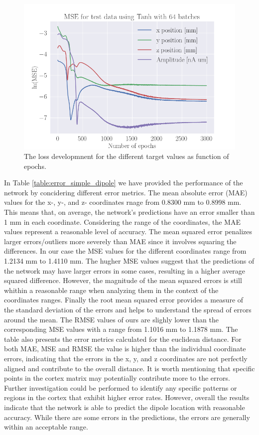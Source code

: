\documentclass[a4paper, UKenglish, 11pt]{uiomaster}
\begin{document}
\begin{figure}[!htb]
    \centering
    \includegraphics[width=\linewidth]{figures/mse_targets_tanh_50000_3july_mseloss_MSE_dipole_w_amplitude_3000_SGD_lr0.001_wd0.1_mom0.35_bs64.png}
    \caption{The loss developmnent for the different target values as function of epochs.}
    \label{fig:dipole_w_amplitude_targets}
\end{figure}

In Table \ref{table:error_simple_dipole} we have provided the performance of the network by concidering different error metrics. The mean absolute error (MAE) values for the x-, y-, and z- coordinates rnage from 0.8300 mm to 0.8998 mm. This means that, on average, the network's predictions have an error smaller than 1 mm in each coordinate. Considering the range of the coordinates, the MAE values represent a reasonable level of accuracy. The mean squared error penalizes larger errors/outliers more severely than MAE since it involves squaring the differences. In our case the MSE values for the different coordinates range from 1.2134 mm to 1.4110 mm. The hugher MSE values suggest that the predictions of the network may have larger errors in some cases, resulting in a higher average squared difference. However, the magnitude of the mean squared errors is still whithin a reasonable range when analyzing them in the context of the coordinates ranges. Finally the root mean squared error provides a measure of the standard deviation of the errors and helps to understand the spread of errors around the mean. The RMSE values of ours are slighly lower than the corresponding MSE values with a range from 1.1016 mm to 1.1878 mm. The table also presents the error metrics calculated for the euclidean distance. For both MAE, MSE and RMSE the value is higher than the individual coordinate errors, indicating that the errors in the x, y, and z coordinates are not perfectly aligned and contribute to the overall distance. It is worth mentioning that specific points in the cortex matrix may potentially contribute more to the errors. Further investigation could be performed to identify any specific patterns or regions in the cortex that exhibit higher error rates. However, overall the results indicate that the network is able to predict the dipole location with reasonable accuracy. While there are some errors in the predictions, the errors are generally within an acceptable range.
\end{document}
